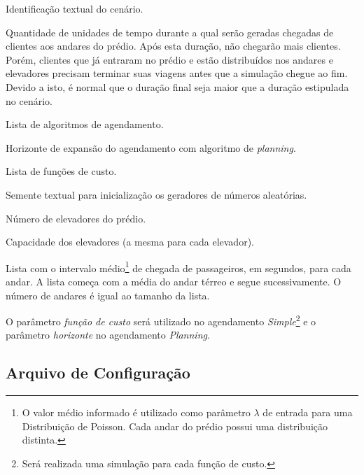 \begin{description}[leftmargin=!,labelwidth=\widthof{\bfseries Função de Custo}]\setlength\itemsep{0mm}
  \item[Nome]
  Identificação textual do cenário.

  \item[Duração]
  Quantidade de unidades de tempo durante a qual serão geradas chegadas de
  clientes aos andares do prédio. Após esta duração, não chegarão mais clientes.
  Porém, clientes que já entraram no prédio e estão distribuídos nos andares e
  elevadores precisam terminar suas viagens antes que a simulação chegue ao fim.
  Devido a isto, é normal que o duração final seja maior que a duração
  estipulada no cenário.

  \item[Agendamento]
  Lista de algoritmos de agendamento.

  \item[Horizonte]
  Horizonte de expansão do agendamento com algoritmo de \textit{planning}.

  \item[Função de Custo]
  Lista de funções de custo.

  \item[Semente]
  Semente textual para inicialização os geradores de números aleatórias.

  \item[Elevadores]
  Número de elevadores do prédio.

  \item[Capacidade]
  Capacidade dos elevadores (a mesma para cada elevador).

  \item[Andares]
  Lista com o intervalo médio\footnote{O valor médio informado é utilizado como
  parâmetro $\lambda$ de entrada para uma Distribuição de Poisson. Cada andar do
  prédio possui uma distribuição distinta.} de chegada de passageiros, em
  segundos, para cada andar. A lista começa com a média do andar térreo e segue
  sucessivamente. O número de andares é igual ao tamanho da lista.

\end{description}

O parâmetro \textit{função de custo} será utilizado no agendamento
\textit{Simple}\footnote{Será realizada uma simulação para cada função de
custo.} e o parâmetro \textit{horizonte} no agendamento \textit{Planning}.

\subsection{\label{model:scenario:config}Arquivo de Configuração}

